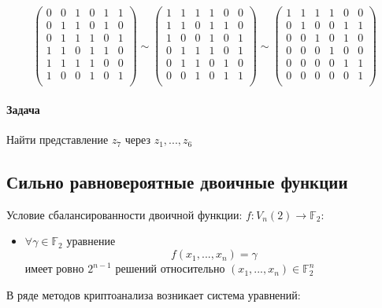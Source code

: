\documentclass[a4paper,12pt]{article}
\begin{document}
	$$
	\begin{pmatrix}
		0 & 0 & 1 & 0 & 1 & 1 \\
		0 & 1 & 1 & 0 & 1 & 0 \\
		0 & 1 & 1 & 1 & 0 & 1 \\
		1 & 1 & 0 & 1 & 1 & 0 \\
		1 & 1 & 1 & 1 & 0 & 0 \\
		1 & 0 & 0 & 1 & 0 & 1 \\
	\end{pmatrix} \sim
	\begin{pmatrix}
		1 & 1 & 1 & 1 & 0 & 0 \\
		1 & 1 & 0 & 1 & 1 & 0 \\
		1 & 0 & 0 & 1 & 0 & 1 \\
		0 & 1 & 1 & 1 & 0 & 1 \\
		0 & 1 & 1 & 0 & 1 & 0 \\
		0 & 0 & 1 & 0 & 1 & 1 \\
	\end{pmatrix} \sim
	\begin{pmatrix}
		1 & 1 & 1 & 1 & 0 & 0 \\
		0 & 1 & 0 & 0 & 1 & 1 \\
		0 & 0 & 1 & 0 & 1 & 0 \\
		0 & 0 & 0 & 1 & 0 & 0 \\
		0 & 0 & 0 & 0 & 1 & 1 \\
		0 & 0 & 0 & 0 & 0 & 1 \\
	\end{pmatrix}
	$$
	
	\paragraph{Задача} Найти представление $z_7$ через $z_1, ..., z_6$

	\subsection{Сильно равновероятные двоичные функции}
	Условие сбалансированности двоичной функции: $f: V_n(2) \rightarrow \mathbb{F}_2$:
	\begin{itemize}
	\item $\forall \gamma \in \mathbb{F}_2$ уравнение \[ f(x_1, ..., x_n) = \gamma \] имеет ровно $2^{n-1}$ решений относительно $(x_1, ..., x_n) \in \mathbb{F}_2^n$
	\end{itemize}

	В ряде методов криптоанализа возникает система уравнений:
\end{document}
